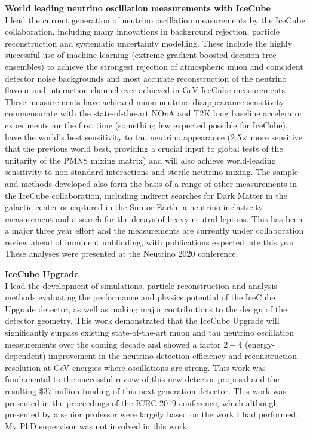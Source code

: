 \documentclass[a4paper,11pt]{article}
\begin{document}
\vspace{0.2cm}

{\bf World leading neutrino oscillation measurements with IceCube} \\ 
I lead the current generation of neutrino oscillation measurements by the IceCube collaboration, including many innovations in background rejection, particle reconstruction and systematic uncertainty modelling. These include the highly successful use of machine learning (extreme gradient boosted decision tree ensembles) to achieve the strongest rejection of atmospheric muon and coincident detector noise backgrounds and most accurate reconstruction of the neutrino flavour and interaction channel ever achieved in GeV IceCube measurements. These measurements have achieved muon neutrino disappearance sensitivity commensurate with the state-of-the-art NO$v$A and T2K long baseline accelerator experiments for the first time (something few expected possible for IceCube), have the world's best sensitivity to tau neutrino appearance (2.5$\times$ more sensitive that the previous world best, providing a crucial input to global tests of the unitarity of the PMNS mixing matrix) and will also achieve world-leading sensitivity to non-standard interactions and sterile neutrino mixing. The sample and methods developed also form the basis of a range of other measurements in the IceCube collaboration, including indirect searches for Dark Matter in the galactic center or captured in the Sun or Earth, a neutrino inelasticity measurement and a search for the decays of heavy neutral leptons. This has been a major three year effort and the measurements are currently under collaboration review ahead of imminent unblinding, with publications expected late this year. These analyses were presented at the Neutrino 2020 conference.

\vspace{0.2cm}

{\bf IceCube Upgrade} \\ 
I lead the development of simulations, particle reconstruction and analysis methods evaluating the performance and physics potential of the IceCube Upgrade detector, as well as making major contributions to the design of the detector geometry. This work demonstrated that the IceCube Upgrade will significantly surpass existing state-of-the-art muon and tau neutrino oscillation measurements over the coming decade and showed a factor $2-4$ (energy-dependent) improvement in the neutrino detection efficiency and reconstruction resolution at GeV energies where oscillations are strong. This work was fundamental to the successful review of this new detector proposal and the resulting \$37 million funding of this next-generation detector. This work was presented in the proceedings of the ICRC 2019 conference, which although presented by a senior professor were largely based on the work I had performed. My PhD supervisor was not involved in this work.
\end{document}
